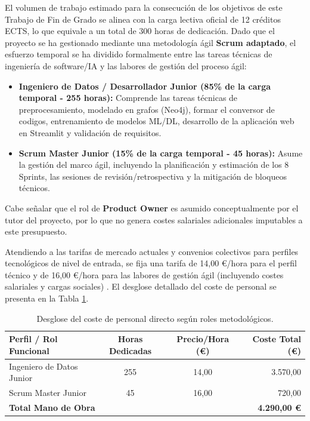 \documentclass[12pt,a4paper,onecolumn,oneside]{report}
\begin{document}
El volumen de trabajo estimado para la consecución de los objetivos de este Trabajo de Fin de Grado se alinea con la carga lectiva oficial de 12 créditos ECTS, lo que equivale a un total de 300 horas de dedicación. Dado que el proyecto se ha gestionado mediante una metodología ágil \textbf{Scrum adaptado}, el esfuerzo temporal se ha dividido formalmente entre las tareas técnicas de ingeniería de software/IA y las labores de gestión del proceso ágil:

\begin{itemize}
    \item \textbf{Ingeniero de Datos / Desarrollador Junior (85\% de la carga temporal - 255 horas):} Comprende las tareas técnicas de preprocesamiento, modelado en grafos (Neo4j), formar el conversor de codigos, entrenamiento de modelos ML/DL, desarrollo de la aplicación web en Streamlit y validación de requisitos.
    \item \textbf{Scrum Master Junior (15\% de la carga temporal - 45 horas):} Asume la gestión del marco ágil, incluyendo la planificación y estimación de los 8 Sprints, las sesiones de revisión/retrospectiva y la mitigación de bloqueos técnicos.
\end{itemize}

Cabe señalar que el rol de \textbf{Product Owner} es asumido conceptualmente por el tutor del proyecto, por lo que no genera costes salariales adicionales imputables a este presupuesto.

Atendiendo a las tarifas de mercado actuales y convenios colectivos para perfiles tecnológicos de nivel de entrada, se fija una tarifa de 14,00 €/hora para el perfil técnico y de 16,00 €/hora para las labores de gestión ágil (incluyendo costes salariales y cargas sociales) \cite{salario-ingeniero-datos}. El desglose detallado del coste de personal se presenta en la Tabla \ref{tab:coste_personal}.

\begin{table}[htbp]
\centering
\small
\renewcommand{\arraystretch}{1.25}
\begin{tabular}{|l|c|c|r|}
\hline
\textbf{Perfil / Rol Funcional} & \textbf{Horas Dedicadas} & \textbf{Precio/Hora (€)} & \textbf{Coste Total (€)} \\ \hline
Ingeniero de Datos Junior & 255 & 14,00 & 3.570,00 \\ \hline
Scrum Master Junior & 45 & 16,00 & 720,00 \\ \hline
\multicolumn{3}{|l|}{\textbf{Total Mano de Obra}} & \textbf{4.290,00 €} \\ \hline
\end{tabular}
\caption{Desglose del coste de personal directo según roles metodológicos.}
\label{tab:coste_personal}
\end{table}
\end{document}
